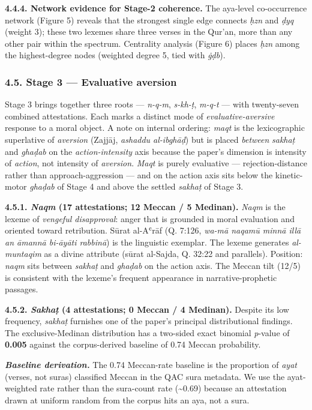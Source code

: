\textbf{4.4.4. Network evidence for Stage-2 coherence.} The aya-level
co-occurrence network (Figure 5) reveals that the strongest single edge
connects \emph{ḥzn} and \emph{ḍyq} (weight 3); these two lexemes share
three verses in the Qur'an, more than any other pair within the
spectrum. Centrality analysis (Figure 6) places \emph{ḥzn} among the
highest-degree nodes (weighted degree 5, tied with \emph{ġḍb}).

\subsubsection{4.5. Stage 3 --- Evaluative
aversion}\label{stage-3-evaluative-aversion}

Stage 3 brings together three roots --- \emph{n-q-m}, \emph{s-kh-ṭ},
\emph{m-q-t} --- with twenty-seven combined attestations. Each marks a
distinct mode of \emph{evaluative-aversive} response to a moral object.
A note on internal ordering: \emph{maqt} is the lexicographic
superlative of \emph{aversion} (Zajjāj, \emph{ashaddu al-ibghāḍ}) but is
placed \emph{between} \emph{sakhaṭ} and \emph{ghaḍab} on the
\emph{action-intensity} axis because the paper's dimension is intensity
of \emph{action}, not intensity of \emph{aversion}. \emph{Maqt} is
purely evaluative --- rejection-distance rather than approach-aggression
--- and on the action axis sits below the kinetic-motor \emph{ghaḍab} of
Stage 4 and above the settled \emph{sakhaṭ} of Stage 3.

\textbf{4.5.1. \emph{Naqm} (17 attestations; 12 Meccan / 5 Medinan).}
\emph{Naqm} is the lexeme of \emph{vengeful disapproval}: anger that is
grounded in moral evaluation and oriented toward retribution. Sūrat
al-Aʿrāf (Q. 7:126, \emph{wa-mā naqamū minnā illā an āmannā bi-āyāti
rabbinā}) is the linguistic exemplar. The lexeme generates
\emph{al-muntaqim} as a divine attribute (sūrat al-Sajda, Q. 32:22 and
parallels). Position: \emph{naqm} sits between \emph{sakhaṭ} and
\emph{ghaḍab} on the action axis. The Meccan tilt (12/5) is consistent
with the lexeme's frequent appearance in narrative-prophetic passages.

\textbf{4.5.2. \emph{Sakhaṭ} (4 attestations; 0 Meccan / 4 Medinan).}
Despite its low frequency, \emph{sakhaṭ} furnishes one of the paper's
principal distributional findings. The exclusive-Medinan distribution
has a two-sided exact binomial \emph{p}-value of \textbf{0.005} against
the corpus-derived baseline of 0.74 Meccan probability.

\textbf{\emph{Baseline derivation.}} The 0.74 Meccan-rate baseline is
the proportion of \emph{ayat} (verses, not suras) classified Meccan in
the QAC sura metadata. We use the ayat-weighted rate rather than the
sura-count rate (\textasciitilde0.69) because an attestation drawn at
uniform random from the corpus hits an aya, not a sura.

